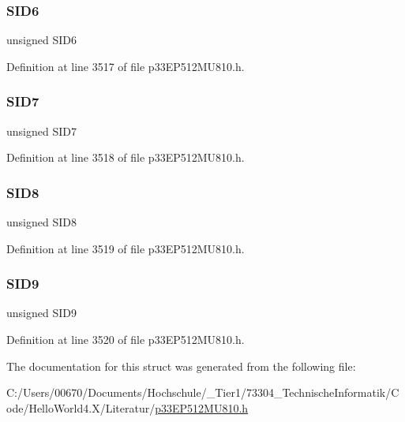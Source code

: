 \subsubsection{\texorpdfstring{S\+I\+D6}{SID6}}
{\footnotesize\ttfamily unsigned S\+I\+D6}



Definition at line 3517 of file p33\+E\+P512\+M\+U810.\+h.

\mbox{\label{structtag_c1_r_x_m1_s_i_d_b_i_t_s_a34097fb76decd431701fa2d86a22328e}} 
\subsubsection{\texorpdfstring{S\+I\+D7}{SID7}}
{\footnotesize\ttfamily unsigned S\+I\+D7}



Definition at line 3518 of file p33\+E\+P512\+M\+U810.\+h.

\mbox{\label{structtag_c1_r_x_m1_s_i_d_b_i_t_s_afe74894633244fdb0b0c01b4e8c522e7}} 
\subsubsection{\texorpdfstring{S\+I\+D8}{SID8}}
{\footnotesize\ttfamily unsigned S\+I\+D8}



Definition at line 3519 of file p33\+E\+P512\+M\+U810.\+h.

\mbox{\label{structtag_c1_r_x_m1_s_i_d_b_i_t_s_a33587704948067005c2a6a3ccc503c99}} 
\subsubsection{\texorpdfstring{S\+I\+D9}{SID9}}
{\footnotesize\ttfamily unsigned S\+I\+D9}



Definition at line 3520 of file p33\+E\+P512\+M\+U810.\+h.



The documentation for this struct was generated from the following file\+:\begin{DoxyCompactItemize}
\item 
C\+:/\+Users/00670/\+Documents/\+Hochschule/\+\_\+\+Tier1/73304\+\_\+\+Technische\+Informatik/\+Code/\+Hello\+World4.\+X/\+Literatur/\hyperlink{p33_e_p512_m_u810_8h}{p33\+E\+P512\+M\+U810.\+h}\end{DoxyCompactItemize}
